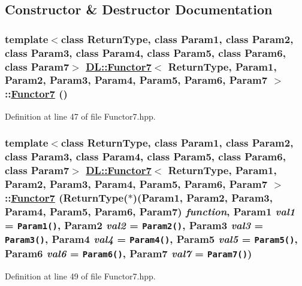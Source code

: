 \subsection{Constructor \& Destructor Documentation}
\hypertarget{classDL_1_1Functor7_d0}{
\subsubsection[Functor7]{\setlength{\rightskip}{0pt plus 5cm}template$<$class Return\-Type, class Param1, class Param2, class Param3, class Param4, class Param5, class Param6, class Param7$>$ \hyperlink{classDL_1_1Functor7}{DL::Functor7}$<$ Return\-Type, Param1, Param2, Param3, Param4, Param5, Param6, Param7 $>$::\hyperlink{classDL_1_1Functor7}{Functor7} ()}}
\label{classDL_1_1Functor7_d0}




Definition at line 47 of file Functor7.hpp.\hypertarget{classDL_1_1Functor7_a0}{
\subsubsection[Functor7]{\setlength{\rightskip}{0pt plus 5cm}template$<$class Return\-Type, class Param1, class Param2, class Param3, class Param4, class Param5, class Param6, class Param7$>$ \hyperlink{classDL_1_1Functor7}{DL::Functor7}$<$ Return\-Type, Param1, Param2, Param3, Param4, Param5, Param6, Param7 $>$::\hyperlink{classDL_1_1Functor7}{Functor7} (Return\-Type($\ast$)(Param1, Param2, Param3, Param4, Param5, Param6, Param7) {\em function}, Param1 {\em val1} = {\tt Param1()}, Param2 {\em val2} = {\tt Param2()}, Param3 {\em val3} = {\tt Param3()}, Param4 {\em val4} = {\tt Param4()}, Param5 {\em val5} = {\tt Param5()}, Param6 {\em val6} = {\tt Param6()}, Param7 {\em val7} = {\tt Param7()})}}
\label{classDL_1_1Functor7_a0}




Definition at line 49 of file Functor7.hpp.

